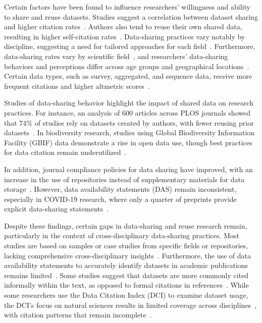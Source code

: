 Certain factors have been found to influence researchers' willingness and ability to share and reuse datasets. Studies suggest a correlation between dataset sharing and higher citation rates~\citep{piwowar_data_2013,piwowar_sharing_2007}. Authors also tend to reuse their own shared data, resulting in higher self-citation rates~\citep{robinson-garcia_analyzing_2016}. Data-sharing practices vary notably by discipline, suggesting a need for tailored approaches for each field~\citep{helbig_supporting_2015,torres-salinas_how_2014}. Furthermore, data-sharing rates vary by scientific field~\citep{tenopir_data_2011}, and researchers’ data-sharing behaviors and perceptions differ across age groups and geographical locations~\citep{tenopir_changes_2015}. Certain data types, such as survey, aggregated, and sequence data, receive more frequent citations and higher altmetric scores~\citep{peters_research_2015}.

Studies of data-sharing behavior highlight the impact of shared data on research practices. For instance, an analysis of 600 articles across PLOS journals showed that 74\% of studies rely on datasets created by authors, with fewer reusing prior datasets~\citep{zhao_data_2018}. In biodiversity research, studies using Global Biodiversity Information Facility (GBIF) data demonstrate a rise in open data use, though best practices for data citation remain underutilized~\citep{khan_measuring_2021}.

In addition, journal compliance policies for data sharing have improved, with an increase in the use of repositories instead of supplementary materials for data storage~\citep{jiao_data_2024}. However, data availability statements (DAS) remain inconsistent, especially in COVID-19 research, where only a quarter of preprints provide explicit data-sharing statements~\citep{strcic_open_2022}.

Despite these findings, certain gaps in data-sharing and reuse research remain, particularly in the context of cross-disciplinary data-sharing practices. Most studies are based on samples or case studies from specific fields or repositories, lacking comprehensive cross-disciplinary insights~\citep{kafkas_database_2015, piwowar_beginning_2011, zhao_data_2018,khan_measuring_2021,cao_rise_2023}. Furthermore, the use of data availability statements to accurately identify datasets in academic publications remains limited~\citep{jiao_data_2024,strcic_open_2022}. Some studies suggest that datasets are more commonly cited informally within the text, as opposed to formal citations in references~\citep{belter_measuring_2014,kafkas_database_2015}. While some researchers use the Data Citation Index (DCI) to examine dataset usage, the DCI's focus on natural sciences results in limited coverage across disciplines~\citep{silvello_theory_2017,park_informal_2018,park_examination_2017}, with citation patterns that remain incomplete~\citep{robinson-garcia_analyzing_2016}.

